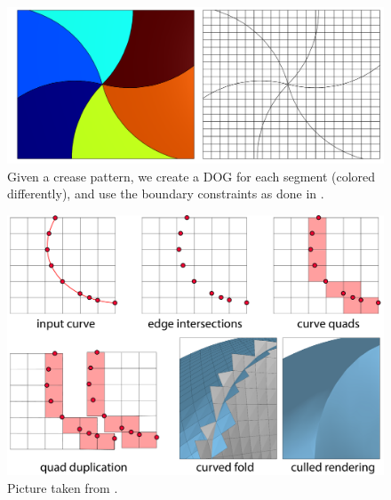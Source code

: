 \begin{figure} [h]
	\centering
	\includegraphics[width=0.8\linewidth]{figures/piecewise_dog_from_crease}
	\caption{Given a crease pattern, we create a DOG for each segment (colored differently), and use the boundary constraints as done in \cite{rabi2018shape}.}
	\label{fig:piecewise_dog_from_crease}
\end{figure}

\begin{figure} [h]
	\centering
	\includegraphics[width=0.8\linewidth]{figures/curve_on_dog}
	\caption{Picture taken from \cite{rabi2018shape}.}
	\label{fig:curve_on_dog}
\end{figure}

